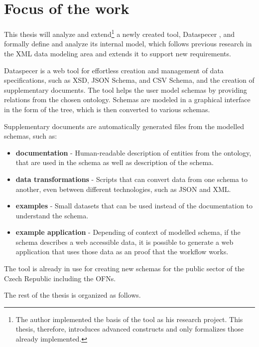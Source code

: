 \newpage
\section*{Focus of the work}

This thesis will analyze and extend\footnote{The author implemented the basis of the tool as his research project. This thesis, therefore, introduces advanced constructs and only formalizes those already implemented.} a newly created tool, Dataspecer \cite{dataspecer}, and formally define and analyze its internal model, which follows previous research in the XML data modeling area and extends it to support new requirements.

Dataspecer is a web tool for effortless creation and management of data specifications, such as XSD, JSON Schema, and CSV Schema, and the creation of supplementary documents. The tool helps the user model schemas by providing relations from the chosen ontology. Schemas are modeled in a graphical interface in the form of the tree, which is then converted to various schemas.

Supplementary documents are automatically generated files from the modelled schemas, such as:

\begin{itemize}
    \item \textbf{documentation} - Human-readable description of entities from the ontology, that are used in the schema as well as description of the schema.
    \item \textbf{data transformations} - Scripts that can convert data from one schema to another, even between different technologies, such as JSON and XML.
    \item \textbf{examples} - Small datasets that can be used instead of the documentation to understand the schema.
    \item \textbf{example application} - Depending of context of modelled schema, if the schema describes a web accessible data, it is possible to generate a web application that uses those data as an proof that the workflow works.
\end{itemize}

The tool is already in use for creating new schemas for the public sector of the Czech Republic including the OFNs.

\bigskip

\noindent The rest of the thesis is organized as follows.

